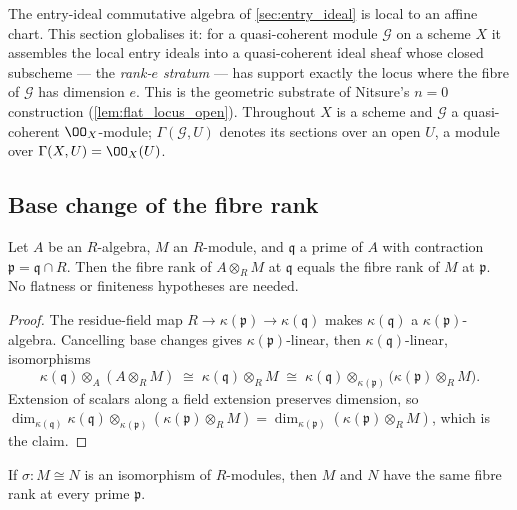 The entry-ideal commutative algebra of \cref{sec:entry_ideal} is local to an
affine chart.  This section globalises it: for a quasi-coherent module
\(\mathcal G\) on a scheme \(X\) it assembles the local entry ideals into a
quasi-coherent ideal sheaf whose closed subscheme --- the \emph{rank-\(e\)
stratum} --- has support exactly the locus where the fibre of \(\mathcal G\)
has dimension \(e\).  This is the geometric substrate of Nitsure's
\(n = 0\) construction (\cref{lem:flat_locus_open}).  Throughout \(X\) is a
scheme and \(\mathcal G\) a quasi-coherent \(\OO_X\)-module; \(\Gamma(\mathcal G, U)\)
denotes its sections over an open \(U\), a module over \(\Gamma(X, U) = \OO_X(U)\).

\subsection{Base change of the fibre rank}

\begin{theorem}
  \label{thm:fiber_rank_base_change}
  \leanok
  Let \(A\) be an \(R\)-algebra, \(M\) an \(R\)-module, and \(\mathfrak q\) a
  prime of \(A\) with contraction \(\mathfrak p = \mathfrak q \cap R\).  Then
  the fibre rank of \(A \otimes_R M\) at \(\mathfrak q\) equals the fibre rank
  of \(M\) at \(\mathfrak p\).  No flatness or finiteness hypotheses are
  needed.
\end{theorem}

\begin{proof}
  \leanok
  The residue-field map \(R \to \kappa(\mathfrak p) \to \kappa(\mathfrak q)\)
  makes \(\kappa(\mathfrak q)\) a \(\kappa(\mathfrak p)\)-algebra.  Cancelling
  base changes gives \(\kappa(\mathfrak p)\)-linear, then
  \(\kappa(\mathfrak q)\)-linear, isomorphisms
  \[
    \kappa(\mathfrak q) \otimes_A (A \otimes_R M)
      \;\cong\; \kappa(\mathfrak q) \otimes_R M
      \;\cong\; \kappa(\mathfrak q) \otimes_{\kappa(\mathfrak p)}
        \bigl(\kappa(\mathfrak p) \otimes_R M\bigr).
  \]
  Extension of scalars along a field extension preserves dimension, so
  \(\dim_{\kappa(\mathfrak q)}
    \kappa(\mathfrak q) \otimes_{\kappa(\mathfrak p)}
    (\kappa(\mathfrak p) \otimes_R M)
    = \dim_{\kappa(\mathfrak p)}(\kappa(\mathfrak p) \otimes_R M)\),
  which is the claim.
\end{proof}

\begin{lemma}
  \label{lem:fiber_rank_congr}
  \leanok
  If \(\sigma : M \cong N\) is an isomorphism of \(R\)-modules, then \(M\) and
  \(N\) have the same fibre rank at every prime \(\mathfrak p\).
\end{lemma}

